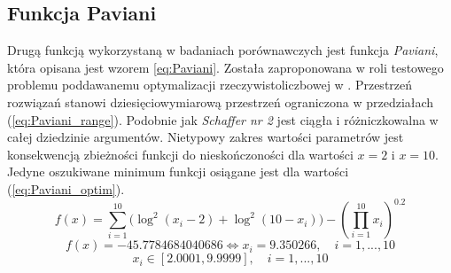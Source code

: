 \subsection{Funkcja Paviani}
\par
Drugą funkcją wykorzystaną w badaniach porównawczych jest funkcja \emph{Paviani}, która opisana jest wzorem \ref{eq:Paviani}. Została zaproponowana w roli testowego problemu poddawanemu optymalizacji rzeczywistoliczbowej w \cite{himmelblau1972applied}. Przestrzeń rozwiązań stanowi dziesięciowymiarową przestrzeń ograniczona w przedziałach (\ref{eq:Paviani_range}). Podobnie jak \emph{Schaffer nr 2} jest ciągła i różniczkowalna w całej dziedzinie argumentów. Nietypowy zakres wartości parametrów jest konsekwencją zbieżności funkcji do nieskończoności dla wartości $x=2$ i $x=10$. Jedyne oszukiwane minimum funkcji osiągane jest dla wartości (\ref{eq:Paviani_optim}).
\begin{equation}\label{eq:Paviani}
f(x)=\sum_{i=1}^{10} \bigg(\log^2(x_i-2) + \log^2(10-x_i)\bigg) - \left(
\prod_{i=1}^{10} x_i\right)^{0.2}
\end{equation}
\begin{equation} \label{eq:Paviani_optim}
f(x)=-45.7784684040686 \Leftrightarrow x_i = 9.350266,\quad i = 1, ..., 10
\end{equation}
\begin{equation} \label{eq:Paviani_range}
x_i\in[2.0001,9.9999], \quad i=1,...,10
\end{equation}

